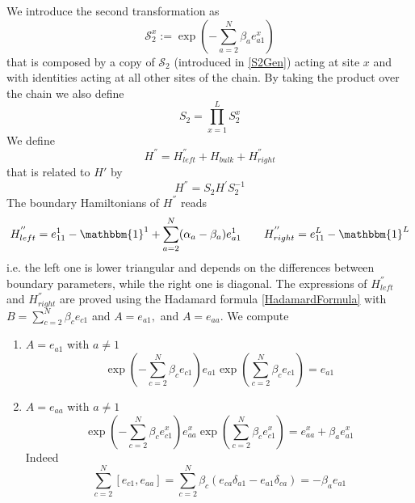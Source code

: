 \documentclass[10pt]{article}
\numberwithin{equation}{section}
\numberwithin{equation}{subsection}
\begin{document}
We introduce the second transformation as 
 \begin{equation}
 	\mathcal{S}_{2}^{x}:=\exp{\left(-\sum_{a=2}^{N}\beta_{a}e_{a1}^{x}\right)}%
 \end{equation}
that is composed by a copy of $\mathcal{S}_{2}$ (introduced in \eqref{S2Gen}) acting at site $x$ and with identities acting at all other sites of the chain. 
By taking the product over the chain we also define
\begin{equation}\label{S2-Whole}
	S_{2}=\prod_{x=1}^{L}S_{2}^{x}
\end{equation}
We define 
\begin{equation}\label{HSecond}
	H^{''}=H_{left}^{''}+H_{bulk}+H_{right}^{''}
\end{equation}
that is related to $H'$ by
\begin{equation}
	H^{''}=S_{2}H^{'}S_{2}^{-1}
\end{equation}
The boundary Hamiltonians of $H^{''}$ reads
\begin{align}
	H_{left}^{''}=e_{11}^{1}-\mathbbm{1}^{1}+\sum_{a=2}^{N}(\alpha_{a}-\beta_{a})e_{a1}^{1}\qquad H_{right}^{''}=e_{11}^{L}-\mathbbm{1}^{L}
\end{align}
i.e. the left one is lower triangular and depends on the differences between boundary parameters, while the right one is diagonal. The expressions of $H_{left}^{''}$ and $H_{right}^{''}$ are proved using the Hadamard formula \eqref{HadamardFormula} with $B=\sum_{c=2}^{N}\beta_{c}e_{c1}$ and $A=e_{a1},$ and $A=e_{aa}$. We compute
\begin{enumerate}
	\item $A=e_{a1}$ with $a\neq 1$
	\begin{equation}
		\exp{\left(-\sum_{c=2}^{N}\beta_{c}e_{c1}\right)}e_{a1}\exp{\left(\sum_{c=2}^{N}\beta_{c}e_{c1}\right)}=e_{a1}
	\end{equation}
\item $A=e_{aa}$ with $a\neq 1$
\begin{equation}
		\exp{\left(-\sum_{c=2}^{N}\beta_{c}e_{c1}^{x}\right)}e_{aa}^{x}\exp{\left(\sum_{c=2}^{N}\beta_{c}e_{c1}^{x}\right)}=e_{aa}^{x}+\beta_{a}e_{a1}^{x}
	\end{equation}
Indeed 
\begin{equation}
	\sum_{c=2}^{N}[e_{c1},e_{aa}]=\sum_{c=2}^{N}\beta_{c}\left(e_{ca}\delta_{a1}-e_{a1}\delta_{ca}\right)=-\beta_{a}e_{a1}
\end{equation}
\end{enumerate}
\end{document}
